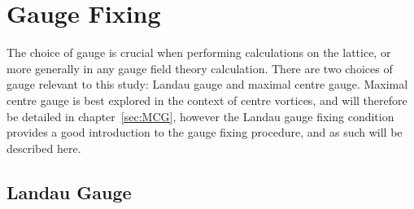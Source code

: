 \section{Gauge Fixing}
The choice of gauge is crucial when performing calculations on the lattice, or more generally in any gauge field theory calculation. There are two choices of gauge relevant to this study: Landau gauge and maximal centre gauge. Maximal centre gauge is best explored in the context of centre vortices, and will therefore be detailed in chapter~\ref{sec:MCG}, however the Landau gauge fixing condition provides a good introduction to the gauge fixing procedure, and as such will be described here.

\subsection{Landau Gauge}\label{sec:LandauGauge}

